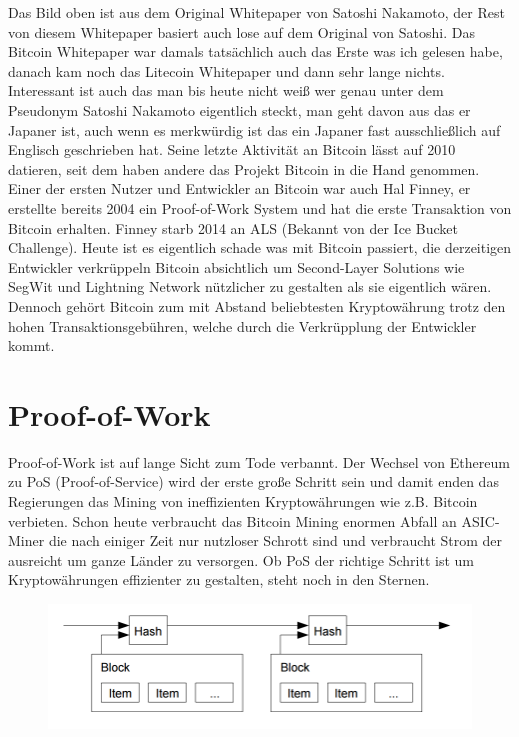 \documentclass[a4paper, 10pt]{article}
\begin{document}
Das Bild oben ist aus dem Original Whitepaper von Satoshi Nakamoto, der Rest von diesem Whitepaper basiert auch lose auf dem Original von Satoshi. Das Bitcoin Whitepaper war damals tatsächlich auch das Erste was ich gelesen habe, danach kam noch das Litecoin Whitepaper und dann sehr lange nichts. Interessant ist auch das man bis heute nicht weiß wer genau unter dem Pseudonym Satoshi Nakamoto eigentlich steckt, man geht davon aus das er Japaner ist, auch wenn es merkwürdig ist das ein Japaner fast ausschließlich auf Englisch geschrieben hat. Seine letzte Aktivität an Bitcoin lässt auf 2010 datieren, seit dem haben andere das Projekt Bitcoin in die Hand genommen. Einer der ersten Nutzer und Entwickler an Bitcoin war auch Hal Finney, er erstellte bereits 2004 ein Proof-of-Work System und hat die erste Transaktion von Bitcoin erhalten. Finney starb 2014 an ALS (Bekannt von der Ice Bucket Challenge). Heute ist es eigentlich schade was mit Bitcoin passiert, die derzeitigen Entwickler verkrüppeln Bitcoin absichtlich um Second-Layer Solutions wie SegWit und Lightning Network nützlicher zu gestalten als sie eigentlich wären. Dennoch gehört Bitcoin zum mit Abstand beliebtesten Kryptowährung trotz den hohen Transaktionsgebühren, welche durch die Verkrüpplung der Entwickler kommt.

\section{Proof-of-Work}\label{proof-of-work}

Proof-of-Work ist auf lange Sicht zum Tode verbannt. Der Wechsel von Ethereum zu PoS (Proof-of-Service) wird der erste große Schritt sein und damit enden das Regierungen das Mining von ineffizienten Kryptowährungen wie z.B. Bitcoin verbieten. Schon heute verbraucht das Bitcoin Mining enormen Abfall an ASIC-Miner die nach einiger Zeit nur nutzloser Schrott sind und verbraucht Strom der ausreicht um ganze Länder zu versorgen. Ob PoS der richtige Schritt ist um Kryptowährungen effizienter zu gestalten, steht noch in den Sternen.

\begin{figure}[!h]
\centering
\includegraphics[width=0.75\linewidth]{proof-of-work.png}
\end{figure}
\newpage
\end{document}
